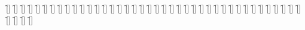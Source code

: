 \begin{questions}
\begin{multicols}{2}
        \question  \f[]
        \question  \f[]
        \question  \f[]
        \question  \f[]
        \question  \f[]
        \question  \f[]
        \question  \f[]
        \question  \f[]
        \question  \f[]
        \question  \f[]
        \question  \f[]
        \question  \f[]
        \question  \f[]
        \question  \f[]
        \question  \f[]
        \question  \f[]
        \question  \f[]
        \question  \f[]
        \question  \f[]
        \question  \f[]
        \question  \f[]
        \question  \f[]
        \question  \f[]
        \question  \f[]
        \question  \f[]
        \question  \f[]
        \question  \f[]
        \question  \f[]
        \question  \f[]
        \question  \f[]
        \question  \f[]
        \question  \f[]
        \question  \f[]
        \question  \f[]
        \question  \f[]
        \question  \f[]
        \question  \f[]
        \question  \f[]
        \question  \f[]
        \question  \f[]
        \question  \f[]
        \question  \f[]
        \question  \f[]
        \question  \f[]
    \end{multicols}
\end{questions}
